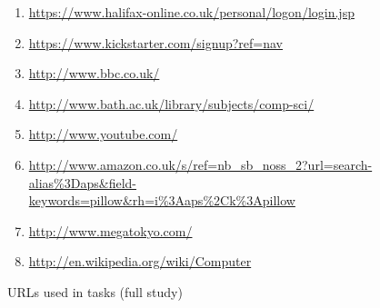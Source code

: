 \documentclass[a4paper, 12pt]{report}
\begin{document}
\begin{figure}[ht]
	\begin{enumerate}
		\item \url{https://www.halifax-online.co.uk/personal/logon/login.jsp}
		\item \url{https://www.kickstarter.com/signup?ref=nav}
		\item \url{http://www.bbc.co.uk/}
		\item \url{http://www.bath.ac.uk/library/subjects/comp-sci/}
		\item \url{http://www.youtube.com/}
		\item \url{http://www.amazon.co.uk/s/ref=nb_sb_noss_2?url=search-alias%3Daps&field-keywords=pillow&rh=i%3Aaps%2Ck%3Apillow}
		\item \url{http://www.megatokyo.com/}
		\item \url{http://en.wikipedia.org/wiki/Computer}
	\end{enumerate}
	\caption{URLs used in tasks (full study)}
	\label{fig:fullStudyURLs}
	\medskip
	\small
\end{figure}
\end{document}
